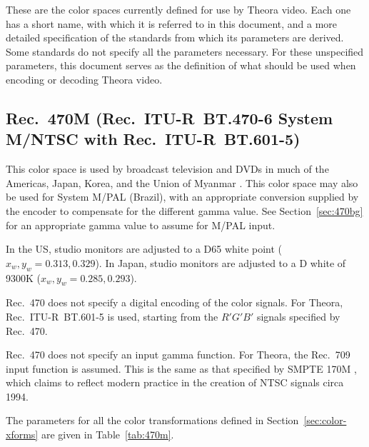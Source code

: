 \documentclass[9pt,letterpaper]{book}
\numberwithin{equation}{chapter}
\numberwithin{figure}{chapter}
\numberwithin{table}{chapter}
\begin{document}
These are the color spaces currently defined for use by Theora video.
Each one has a short name, with which it is referred to in this document, and
 a more detailed specification of the standards from which its parameters are
 derived.
Some standards do not specify all the parameters necessary.
For these unspecified parameters, this document serves as the definition of
 what should be used when encoding or decoding Theora video.

\subsection{Rec.~470M (Rec.~ITU-R~BT.470-6 System M/NTSC with
 Rec.~ITU-R~BT.601-5)}
\label{sec:470m}

This color space is used by broadcast television and DVDs in much of the
 Americas, Japan, Korea, and the Union of Myanmar \cite{rec470}.
This color space may also be used for System M/PAL (Brazil), with an
 appropriate conversion supplied by the encoder to compensate for the
 different gamma value.
See Section~\ref{sec:470bg} for an appropriate gamma value to assume for M/PAL
 input.

In the US, studio monitors are adjusted to a D65 white point
 ($x_w,y_w=0.313,0.329$).
In Japan, studio monitors are adjusted to a D white of 9300K
 ($x_w,y_w=0.285,0.293$).

Rec.~470 does not specify a digital encoding of the color signals.
For Theora, Rec.~ITU-R~BT.601-5 \cite{rec601} is used, starting from the
 $R'G'B'$ signals specified by Rec.~470.

Rec.~470 does not specify an input gamma function.
For Theora, the Rec.~709 \cite{rec709} input function is assumed.
This is the same as that specified by SMPTE 170M \cite{smpte170m}, which claims
 to reflect modern practice in the creation of NTSC signals circa 1994.

The parameters for all the color transformations defined in
 Section~\ref{sec:color-xforms} are given in Table~\ref{tab:470m}.
\end{document}
